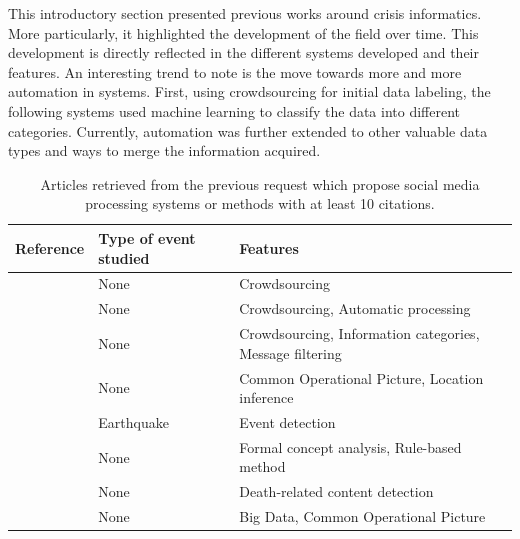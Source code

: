 This introductory section presented previous works around crisis informatics.
More particularly, it highlighted the development of the field over time.
This development is directly reflected in the different systems developed and their features.
An interesting trend to note is the move towards more and more automation in systems.
First, using crowdsourcing for initial data labeling, the following systems used machine learning to classify the data into different categories.
Currently, automation was further extended to other valuable data types and ways to merge the information acquired.

\begin{table}[bh]
    \centering
    \tabulinesep=1.2mm
    \caption{Articles retrieved from the previous request which propose social media processing systems or methods with at least 10 citations.}
    \begin{tabu} to \textwidth {X[3,m]X[1.5,m]X[5,m]}
        Reference                                       & Type of event studied & Features                                                 \\ [0.5ex]
        \toprule
        \cite{schulzCrisisInformationManagement2012}    & None                  & Crowdsourcing                                            \\
        \cite{backfriedOpenSourceIntelligence2012}      & None                  & Crowdsourcing, Automatic processing                      \\
        \cite{imranAIDRArtificialIntelligence2014}      & None                  & Crowdsourcing, Information categories, Message filtering \\
        \cite{middletonRealtimeCrisisMapping2014}       & None                  & Common Operational Picture, Location inference           \\
        \cite{avvenutiEARSEarthquakeAlert2014}          & Earthquake            & Event detection                                          \\
        \cite{gibsonCombiningBigSocial2014}             & None                  & Formal concept analysis, Rule-based method               \\
        \cite{glasgowOurGriefUnspeakable2014}           & None                  & Death-related content detection                          \\
        \cite{huangDisasterMapperCyberGISFramework2015} & None                  & Big Data, Common Operational Picture                     \\

\end{tabu}
\end{table}
